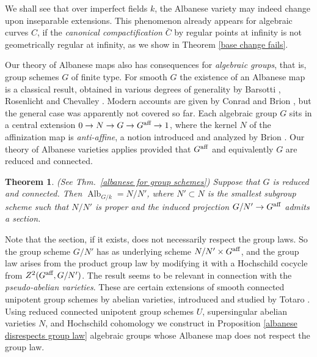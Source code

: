 \documentclass[oneside, 12pt]{amsart}
\newtheorem*{maintheorem}{Theorem}
\theoremstyle{definition}
\theoremstyle{remark}
\newcommand{\aff}{\text{\rm aff}}
\newcommand{\Alb}{\operatorname{Alb}}
\newcommand{\ra}{\rightarrow}
\begin{document}
We shall see that over imperfect fields $k$,
the Albanese variety   may indeed change upon inseparable extensions. This phenomenon already appears for algebraic curves $C$,
if the \emph{canonical compactification} $\bar{C}$ by regular points at infinity is  not geometrically regular at infinity,
as we show in  Theorem \ref{base change fails}.  
 
Our theory of Albanese maps also has   consequences for \emph{algebraic groups}, that is, 
group schemes $G$ of finite type.
For smooth $G$ the existence of an Albanese map is a classical result, obtained in various degrees of generality
by Barsotti \cite{Barsotti 1955}, Rosenlicht \cite{Rosenlicht 1956} and Chevalley \cite{Chevalley 1960}.
Modern accounts are given by Conrad \cite{Conrad  2002} and Brion \cite{Brion 2017}, but the general case was apparently not covered so far.
Each  algebraic group $G$ sits in a central extension $0\ra N\ra G\ra G^\aff\ra 1$,
where the kernel $N$ of the affinization map is   \emph{anti-affine}, a notion introduced and analyzed by Brion \cite{Brion 2009}.
Our theory of Albanese varieties applies provided that 
 $G^\aff$ and equivalently $G$ are  reduced and connected.

\begin{maintheorem}
(See Thm.\ \ref{albanese for group schemes})
Suppose that $G$ is reduced and connected. Then 
$\Alb_{G/k}=N/N'$, where $N'\subset N$ is the smallest subgroup scheme such that $N/N'$ is proper and
the induced projection $G/N'\ra G^\aff$ admits a section.
\end{maintheorem}

Note that  the section, if it exists,  does not necessarily respect the group laws. So
the group scheme $G/N'$ has as underlying scheme   $N/N'\times G^\aff$, and the group law arises from the product group law
by modifying it with   a Hochschild cocycle from $Z^2(G^\aff,G/N')$.
The result seems to be relevant in connection with the \emph{pseudo-abelian varieties}. These are certain extensions
of smooth connected unipotent group schemes by abelian varieties, introduced and studied by Totaro \cite{Totaro 2013}.
Using reduced connected  unipotent group schemes $U$, supersingular abelian varieties $N$, and Hochschild cohomology
we   construct in Proposition \ref{albanese disrespects group law} algebraic groups  whose Albanese map does not respect the group law.
\end{document}
